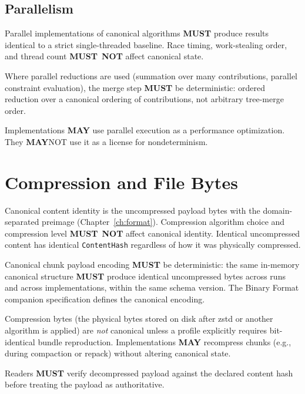 \documentclass[11pt,letterpaper]{report}
\newcounter{requirement}[chapter]
\newcommand{\MUST}{\textbf{MUST}}
\newcommand{\MUSTNOT}{\textbf{MUST}\nobreak\ \textbf{NOT}}
\newcommand{\MAY}{\textbf{MAY}}
\begin{document}
\subsection{Parallelism}

\begin{requirement}
  \label{req:determinism:parallel-baseline-equivalence}
  Parallel implementations of canonical algorithms \MUST{}
  produce results identical to a strict single-threaded baseline.
  Race timing, work-stealing order, and thread count \MUSTNOT{}
  affect canonical state.

  Where parallel reductions are used (summation over many
  contributions, parallel constraint evaluation), the merge step
  \MUST{} be deterministic: ordered reduction over a canonical
  ordering of contributions, not arbitrary tree-merge order.

  Implementations \MAY{} use parallel execution as a performance
  optimization. They \MAY NOT{} use it as a license for
  nondeterminism.
\end{requirement}

\section{Compression and File Bytes}
\label{sec:det:compression}

\begin{requirement}
  \label{req:determinism:compression-independent-identity}
  Canonical content identity is the uncompressed payload bytes
  with the domain-separated preimage
  (Chapter~\ref{ch:format}). Compression algorithm choice and
  compression level \MUSTNOT{} affect canonical identity.
  Identical uncompressed content has identical
  \texttt{ContentHash} regardless of how it was physically
  compressed.

  Canonical chunk payload encoding \MUST{} be deterministic: the
  same in-memory canonical structure \MUST{} produce identical
  uncompressed bytes across runs and across implementations,
  within the same schema version. The Binary Format companion
  specification defines the canonical encoding.

  Compression bytes (the physical bytes stored on disk after
  zstd or another algorithm is applied) are \emph{not} canonical
  unless a profile explicitly requires bit-identical bundle
  reproduction. Implementations \MAY{} recompress chunks (e.g.,
  during compaction or repack) without altering canonical state.

  Readers \MUST{} verify decompressed payload against the
  declared content hash before treating the payload as
  authoritative.
\end{requirement}
\end{document}
